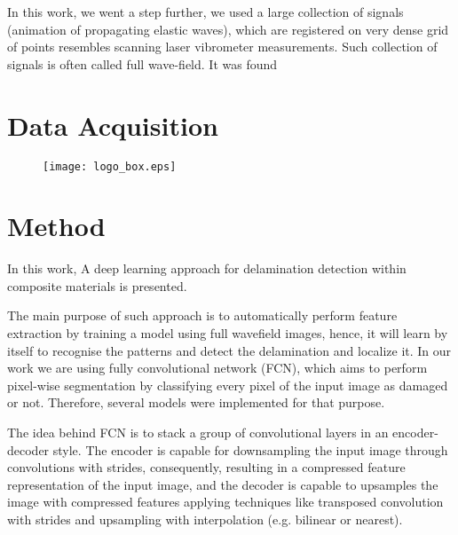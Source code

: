 \documentclass[preprint,9pt]{elsarticle}
\begin{document}
In this work, we went a step further, we used a large collection of signals (animation of propagating elastic waves), which are registered on very dense grid of points resembles scanning laser vibrometer measurements. Such collection of signals is often called full wave-field. 
It was found
\section{Data Acquisition}
	
\begin{figure}
	\texttt{[image: logo\_box.eps]}
\end{figure}
\section*{ }
%

\section{Method}

In this work, A deep learning approach for delamination detection within composite materials is presented. 

The main purpose of such approach is to automatically perform feature extraction by training a model using full wavefield images, hence, it will learn by itself to recognise the patterns and detect the delamination and localize it.
In our work we are using fully convolutional network (FCN), which aims to perform pixel-wise segmentation by classifying every pixel of the input image as damaged or not. 
Therefore, several models were implemented for that purpose.

The idea behind FCN is to stack a group of convolutional layers in an encoder-decoder style. 
The encoder is capable for downsampling the input image through convolutions with strides, consequently, resulting in a compressed feature representation of the input image, and the decoder is capable to upsamples the image with compressed features applying techniques like transposed convolution with strides and upsampling with interpolation (e.g. bilinear or nearest).
\end{document}
